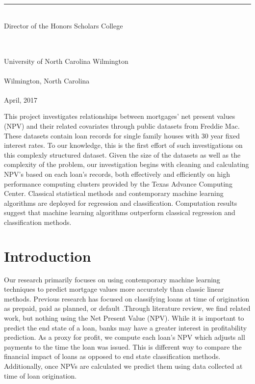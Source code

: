 \documentclass[12 pt]{uncw_thesis}
\theoremstyle{plain}
\theoremstyle{remark}
\theoremstyle{definition}
\begin{document}
\begin{singlespace}
    \rule{7.5cm}{.01in}\\
     Director of the Honors Scholars College \\
\begin{center}   
    \hskip 1pt \\
    \hskip 1pt \\    %
    University of North Carolina Wilmington\\
    \hskip 1pt \\    %
    Wilmington, North Carolina \\
    \hskip 1pt \\    %
    April, 2017\\
\end{center}
\end{singlespace}
\newpage

%
%

\newpage
\pagestyle{plain}
\begin{center}
\tableofcontents
\end{center}


%
%

This project investigates relationships between mortgages' net present values (NPV) and their related covariates through public datasets from Freddie Mac. These datasets contain loan records for single family houses with 30 year fixed interest rates. To our knowledge, this is the first effort of such investigations on this complexly structured dataset. Given the size of the datasets as well as the complexity of the problem, our investigation begins with cleaning and calculating NPV’s based on each loan’s records, both effectively and efficiently on high performance computing clusters provided by the Texas Advance Computing Center. Classical statistical methods and contemporary machine learning algorithms are deployed for regression and classification. Computation results suggest that machine learning algorithms outperform classical regression and classification methods.

\newpage
{}
\section{Introduction}
\thispagestyle{plain}
Our research primarily focuses on using contemporary machine learning techniques to  predict mortgage values more accurately than classic linear methods. Previous research has focused on classifying loans at time of origination as prepaid, paid as planned, or default \cite{Deng}.Through literature review, we find related work, but nothing using the Net Present Value (NPV). While it is important to predict the end state of a loan, banks may have a greater interest in profitability prediction. As a proxy for profit, we compute each loan's NPV which adjusts all payments to the time the loan was issued. This is different way to compare the financial impact of loans as opposed to end state classification methods. Additionally, once NPVs are calculated we predict them using data collected at time of loan origination. 
\end{document}
